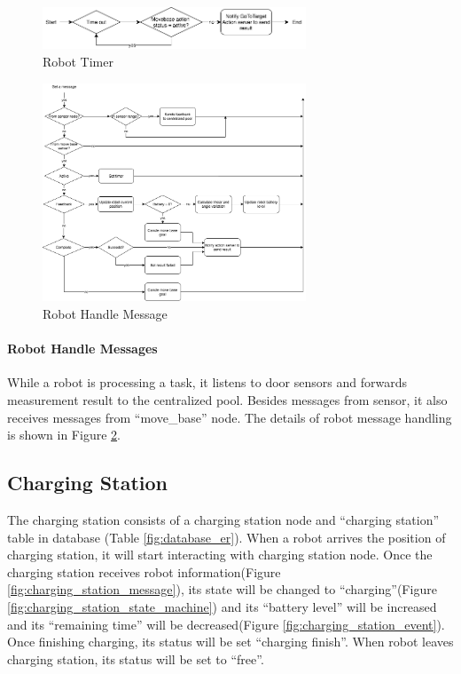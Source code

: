 \begin{figure}[htbp]
    \centering
    \includegraphics[width = 0.7\textwidth]{content/images/ch4/robot_timer.drawio.png}
    \caption{Robot Timer}
    \label{fig:robot_timer}
\end{figure}

\begin{figure}[htbp]
    \centering
    \includegraphics[width = 0.7\textwidth]{content/images/ch4/robot_message.drawio.png}
    \caption{Robot Handle Message}
    \label{fig:robot_handle_message}
\end{figure}

\paragraph{Robot Handle Messages}
While a robot is processing a task, it listens to door sensors and forwards measurement result to the centralized pool. 
Besides messages from sensor, it also receives messages from ``move\_base'' node. The details of robot message handling is shown in Figure \ref{fig:robot_handle_message}.

\subsection{Charging Station}
\label{sec:charging_station}
The charging station consists of a charging station node and ``charging station'' table in database (Table \ref{fig:database_er}). 
When a robot arrives the position of charging station, it will start interacting with charging station node. Once the charging station receives robot information(Figure \ref{fig:charging_station_message}), its state will be changed to ``charging''(Figure \ref{fig:charging_station_state_machine}) and its ``battery level'' will be increased and its ``remaining time'' will be decreased(Figure \ref{fig:charging_station_event}).  
Once finishing charging, its status will be set ``charging finish''. When robot leaves charging station, its status will be set to ``free''. 


